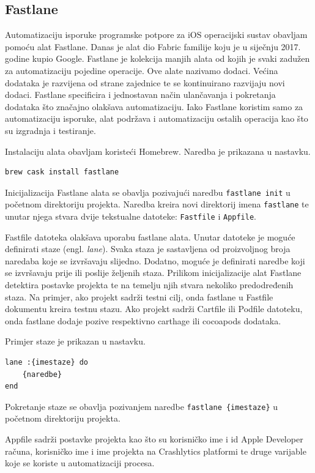 \documentclass[times, utf8, diplomski, numeric]{fer}
\newcommand{\eng}[1]{(engl. \textit{#1})}
\begin{document}
\begin{appendices}
\chapter{Fastlane}

Automatizaciju isporuke programske potpore za iOS operacijski sustav obavljam pomoću alat Fastlane. Danas je alat dio Fabric familije koju je u siječnju 2017. godine kupio Google. Fastlane je kolekcija manjih alata od kojih je svaki zadužen za automatizaciju pojedine operacije. Ove alate nazivamo dodaci. Većina dodataka je razvijena od strane zajednice te se kontinuirano razvijaju novi dodaci. Fastlane specificira i jednostavan način ulančavanja i pokretanja dodataka što značajno olakšava automatizaciju. Iako Fastlane koristim samo za automatizaciju isporuke, alat podržava i automatizaciju ostalih operacija kao što su izgradnja i testiranje.

Instalaciju alata obavljam koristeći Homebrew. Naredba je prikazana u nastavku.

\begin{verbatim}
brew cask install fastlane
\end{verbatim}

Inicijalizacija Fastlane alata se obavlja pozivajući naredbu \verb|fastlane init| u početnom direktoriju projekta. Naredba kreira novi direktorij imena \verb|fastlane| te unutar njega stvara dvije tekstualne datoteke: \verb|Fastfile| i \verb|Appfile|.

Fastfile datoteka olakšava uporabu fastlane alata. Unutar datoteke je moguće definirati staze \eng{lane}. Svaka staza je sastavljena od proizvoljnog broja naredaba koje se izvršavaju slijedno. Dodatno, moguće je definirati naredbe koji se izvršavaju prije ili poslije željenih staza. Prilikom inicijalizacije alat Fastlane detektira postavke projekta te na temelju njih stvara nekoliko predodređenih staza. Na primjer, ako projekt sadrži testni cilj, onda fastlane u Fastfile dokumentu kreira testnu stazu. Ako projekt sadrži Cartfile ili Podfile datoteku, onda fastlane dodaje pozive respektivno carthage ili cocoapods dodataka.

Primjer staze je prikazan u nastavku.

\begin{verbatim}
lane :{imestaze} do
    {naredbe}
end
\end{verbatim}

Pokretanje staze se obavlja pozivanjem naredbe \verb|fastlane {imestaze}| u početnom direktoriju projekta.

Appfile sadrži postavke projekta kao što su korisničko ime i id Apple Developer računa, korisničko ime i ime projekta na Crashlytics platformi te druge varijable koje se koriste u automatizaciji procesa.


\end{appendices}
\end{document}
